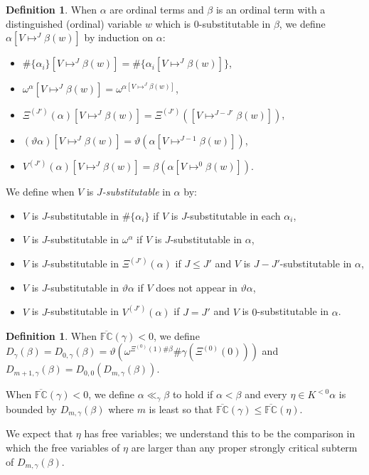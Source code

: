 \documentclass[11pt]{amsart}
\theoremstyle{definition}
\newtheorem{definition}[theorem]{Definition}
\begin{document}
\begin{definition}
  When $\alpha$ are ordinal terms and $\beta$ is an ordinal term with a distinguished (ordinal) variable $w$ which is $0$-substitutable in $\beta$, we define $\alpha[V\mapsto^J\beta(w)]$ by induction on $\alpha$:
  \begin{itemize}
  \item $\#\{\alpha_i\}[V\mapsto^J\beta(w)]=\#\{\alpha_i[V\mapsto^J\beta(w)]\}$,
  \item $\omega^\alpha[V\mapsto^J\beta(w)]=\omega^{\alpha[V\mapsto^J\beta(w)]}$,
  \item $\Xi^{(J')}(\alpha)[V\mapsto^J\beta(w)]=\Xi^{(J')}([V\mapsto^{J-J'}\beta(w)])$,
  \item $(\vartheta\alpha)[V\mapsto^J\beta(w)]=\vartheta(\alpha[V\mapsto^{J-1}\beta(w)])$,
  \item $V^{(J')}(\alpha)[V\mapsto^J\beta(w)]=\beta(\alpha[V\mapsto^0\beta(w)])$.
  \end{itemize}

  We define when $V$ is \emph{$J$-substitutable} in $\alpha$ by:
  \begin{itemize}
  \item $V$ is $J$-substitutable in $\#\{\alpha_i\}$ if $V$ is $J$-substitutable in each $\alpha_i$,
  \item $V$ is $J$-substitutable in $\omega^\alpha$ if $V$ is $J$-substitutable in $\alpha$,
  \item $V$ is $J$-substitutable in $\Xi^{(J')}(\alpha)$ if $J\leq J'$ and $V$ is $J-J'$-substitutable in $\alpha$,
  \item $V$ is $J$-substitutable in $\vartheta\alpha$ if $V$ does not appear in $\vartheta\alpha$,%
  \item $V$ is $J$-substitutable in $V^{(J')}(\alpha)$ if $J=J'$ and $V$ is $0$-substitutable in $\alpha$.
  \end{itemize}
\end{definition}

\begin{definition}
  When $\overline{\mathbb{FC}}(\gamma)<0$, we define $D_\gamma(\beta)=D_{0,\gamma}(\beta)=\vartheta(\omega^{\Xi^{(0)}(1)\#\beta}\#\gamma(\Xi^{(0)}(0)))$ and $D_{m+1,\gamma}(\beta)=D_{0,0}(D_{m,\gamma}(\beta))$.

  When $\overline{\mathbb{FC}}(\gamma)<0$, we define $\alpha\ll_\gamma\beta$ to hold if $\alpha<\beta$ and every $\eta\in K^{<0}\alpha$ is bounded by $D_{m,\gamma}(\beta)$ where $m$ is least so that $\overline{\mathbb{FC}}(\gamma)\leq\overline{\mathbb{FC}}(\eta)$.
\end{definition}
We expect that $\eta$ has free variables; we understand this to be the comparison in which the free variables of $\eta$ are larger than any proper strongly critical subterm of $D_{m,\gamma}(\beta)$.
\end{document}
